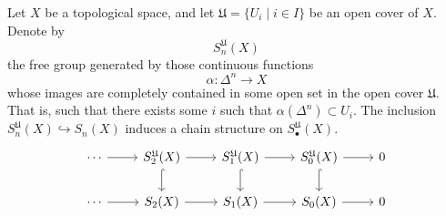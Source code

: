 \documentclass[main.tex]{subfiles}
\begin{document}
Let $X$ be a topological space, and let $\mathfrak{U} = \{U_{i} \mid i \in I\}$ be an open cover of $X$. Denote by
\begin{equation*}
  S^{\mathfrak{U}}_{n}(X)
\end{equation*}
the free group generated by those continuous functions
\begin{equation*}
  \alpha\colon \Delta^{n} \to X
\end{equation*}
whose images are completely contained in some open set in the open cover $\mathfrak{U}$. That is, such that there exists some $i$ such that $\alpha(\Delta^{n}) \subset U_{i}$. The inclusion $S^{\mathfrak{U}}_{n}(X) \hookrightarrow S_{n}(X)$ induces a chain structure on $S^{\mathfrak{U}}_{\bullet}(X)$.
\begin{equation*}
  \begin{tikzcd}
    \cdots
    \arrow[r]
    & S^{\mathfrak{U}}_{2}(X)
    \arrow[r]
    \arrow[d, hook]
    & S^{\mathfrak{U}}_{1}(X)
    \arrow[r]
    \arrow[d, hook]
    & S^{\mathfrak{U}}_{0}(X)
    \arrow[r]
    \arrow[d, hook]
    & 0
    \\
    \cdots
    \arrow[r]
    & S_{2}(X)
    \arrow[r]
    & S_{1}(X)
    \arrow[r]
    & S_{0}(X)
    \arrow[r]
    & 0
  \end{tikzcd}
\end{equation*}
\end{document}
